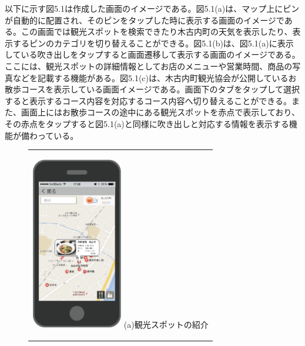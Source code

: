 以下に示す図5.1は作成した画面のイメージである。図5.1(a)は、マップ上にピンが自動的に配置され、そのピンをタップした時に表示する画面のイメージである。この画面では観光スポットを検索できたり木古内町の天気を表示したり、表示するピンのカテゴリを切り替えることができる。図5.1(b)は、図5.1(a)に表示している吹き出しをタップすると画面遷移して表示する画面のイメージである。ここには、観光スポットの詳細情報としてお店のメニューや営業時間、商品の写真などを記載する機能がある。図5.1(c)は、木古内町観光協会が公開しているお散歩コースを表示している画面イメージである。画面下のタブをタップして選択すると表示するコース内容を対応するコース内容へ切り替えることができる。また、画面上にはお散歩コースの途中にある観光スポットを赤点で表示しており、その赤点をタップすると図5.1(a)と同様に吹き出しと対応する情報を表示する機能が備わっている。

\begin{figure}[htbp]
  \begin{center}
    \begin{tabular}{c}

      \begin{minipage}{0.33\hsize}
        \begin{center}
\includegraphics[width=4cm, bb=0 0 303 573]{5.2_map1.png}
          \hspace{1cm} %
          {\footnotesize (a)観光スポットの紹介}
        \end{center}
      \end{minipage}


\end{tabular}
\end{center}
\end{figure}
